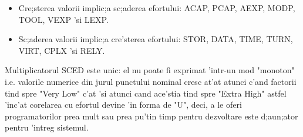 \begin{itemize}
\item Cre;sterea valorii implic;a sc;aderea efortului: ACAP, PCAP, AEXP, MODP, TOOL, VEXP 'si LEXP.
\item Sc;aderea valorii implic;a cre'sterea efortului: STOR, DATA, TIME, TURN, VIRT, CPLX 'si RELY.
\end{itemize}
Multiplicatorul SCED este unic: el nu poate fi exprimat 'intr-un mod "monoton" i.e. valorile numerice din jurul punctului nominal cresc at'at atunci c'and factorii tind spre "Very Low" c'at 'si atunci cand ace'stia tind spre "Extra High" astfel 'inc'at corelarea cu efortul devine 'in forma de "U", deci, a le oferi programatorilor prea mult sau prea pu'tin timp pentru dezvoltare este d;aun;ator pentru 'intreg sistemul.